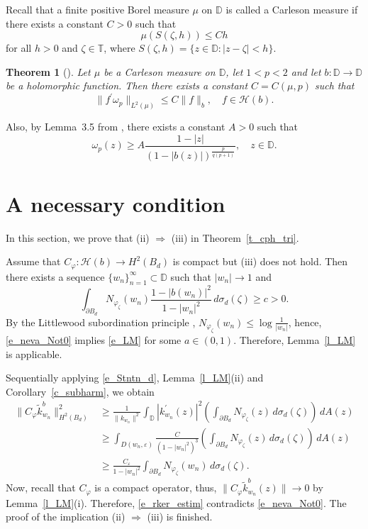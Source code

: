 \documentclass{amsart}
\numberwithin{equation}{section}
\newtheorem{theorem}{Theorem}[section]
\theoremstyle{definition}
\newcommand{\bd}{{B_d}}
\newcommand{\neva}{N}
\newcommand{\bneva}{\mathcal{N}}
\newcommand{\aream}{A}
\newcommand{\meal}{\sigma_d}
\newcommand{\dbr}{\mathcal{H}}
\newcommand{\er}{\varepsilon}
\newcommand{\za}{\zeta}
\newcommand{\ph}{\varphi}
\newcommand{\cph}{C_\varphi}
\newcommand{\om}{\omega}
\newcommand{\Dbb}{\mathbb D}
\newcommand{\Tbb}{\mathbb T}
\newcommand{\knl}{k}
\newcommand{\spd}{\partial B_d}
\begin{document}
Recall that a finite positive Borel measure $\mu$ on $\Dbb$ is called a Carleson measure
if there exists a constant $C>0$ such that
\[
\mu(S(\za, h)) \le C h
\]
for all $h>0$ and $\za\in \Tbb$, where $S(\za, h) = \{z\in\Dbb: |z-\za|< h\}$.

\begin{theorem}[{\cite[Theorem 4.1]{BFM10}}]\label{t_2}
Let $\mu$ be a Carleson measure on $\Dbb$, let $1<p<2$ and let $b: \Dbb \to \Dbb$ be a holomorphic function.
Then there exists a constant $C= C(\mu, p)$  such that
\[
\|f^\prime \om_p\|_{L^2(\mu)} \le C\|f\|_b, \quad f\in\dbr(b).
\]
\end{theorem}

Also, by Lemma~3.5 from \cite{BFM10}, there exists a constant $A>0$ such that
\begin{equation}\label{e_om_p_A}
\om_p(z)\ge A \frac{1-|z|}{\left(1- |b(z)| \right)^{\frac{p}{q(p+1)}}}, \quad z \in \Dbb.
\end{equation}




\section{A necessary condition}\label{s_nec}

In this section, we prove that (ii) $\Rightarrow$ (iii) in Theorem~\ref{t_cph_tri}.


Assume that $\cph: \dbr(b)\to H^2(\bd)$ is compact but (iii) does not hold.
Then there exists a sequence $\{w_n\}_{n=1}^\infty \subset \Dbb$ such that $|w_n|\to 1$ and
\begin{equation}\label{e_neva_Not0}
\int_{\spd}\neva_{\ph_\za}(w_n) \frac{1-|b(w_n)|^2}{1-|w_n|^2}\, d\meal(\za)\ge c> 0.
\end{equation}
By the Littlewood subordination principle \cite{L25}, $\neva_{\ph_\za}(w_n) \le \log\frac{1}{|w_n|}$,
hence, \eqref{e_neva_Not0} implies \eqref{e_LM} for some $a\in (0,1)$.
Therefore, Lemma~\ref{l_LM} is applicable.

Sequentially applying \eqref{e_Stntn_d}, Lemma~\ref{l_LM}(ii) and Corollary~\ref{c_subharm}, we obtain
\begin{equation}\label{e_rker_estim}
\begin{aligned}
\|C_\ph \widetilde{\knl}_{w_n}^b \|^2_{H^2(\bd)}
    &\ge \frac{1}{\|\knl_{w_n}\|^2} \int_{\Dbb} |\knl^\prime_{w_n}(z)|^2
\left(\int_{\spd} \neva_{\ph_\za}(z)\,  d\meal(\za) \right)\, d\aream(z)\\
    &\ge \int_{D(w_n, \er)} \frac{C}{(1- |w_n|^2)^{3}}
\left(\int_{\spd} \neva_{\ph_\za}(z)\,  d\meal(\za) \right)\, d\aream(z)\\
    &\ge \frac{C_\er}{1- |w_n|^2} \int_{\spd} \neva_{\ph_\za}(w_n)\,d\meal(\za).
\end{aligned}
\end{equation}
Now, recall that $C_\ph$ is a compact operator, 
thus, $\|C_\ph \widetilde{\knl}_{w_n}^b(z)\| \to 0$ by Lemma~\ref{l_LM}(i).
Therefore, \eqref{e_rker_estim} contradicts \eqref{e_neva_Not0}.
The proof of the implication (ii) $\Rightarrow$ (iii) is finished.
\end{document}
